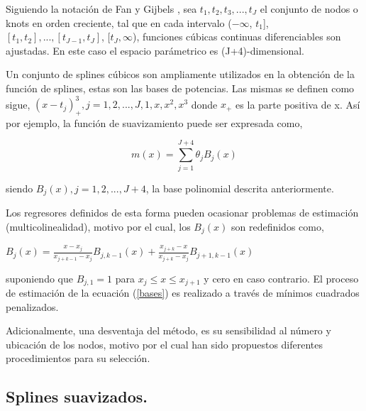 \hspace*{0.4 cm}Siguiendo la notaci\'on de Fan y Gijbels \cite{FG}, sea $t_{1}, t_{2}, t_{3},...,t_{J}$ el conjunto de nodos o knots en orden creciente, tal que en cada intervalo  ($-\infty$, $t_{1}$], $[t_{1}, t_{2}],..., [t_{J-1}, t_{J}]$, [$t_{J}, \infty$), funciones c\'ubicas continuas diferenciables son ajustadas. En este caso el espacio par\'ametrico es (J+4)-dimensional.

\hspace*{0.4 cm} Un conjunto de splines c\'ubicos son ampliamente utilizados en la obtenci\'on de la funci\'on de splines, estas son las bases de potencias. Las mismas se definen como sigue, $(x- t_{j})_{+}^{3}, j= 1,2,...,J,1,x,x^2,x^3$ donde $x_{+}$ es la parte positiva de x. As\'i por ejemplo, la funci\'on de suavizamiento puede ser expresada como,

\begin{equation}
m(x) = \sum_{j=1}^{J+4} \theta_{j}B_{j}(x) 
\label{bases}
\end{equation}

\noindent siendo $B_{j}(x), j = 1, 2,... , J+4$, la base polinomial descrita anteriormente.

\hspace*{0.4 cm} Los regresores definidos de esta forma pueden ocasionar problemas de estimaci\'on (multicolinealidad), motivo por el cual, los $B_{j}(x)$ son
redefinidos como,

\vspace*{0.2 cm}


\begin{center}
$\displaystyle{ B_{j}(x) = \frac{x-x_{j}}{x_{j+k-1}-x_{j}} B_{j,k-1}(x) + \frac{x_{j+k}-x}{x_{j+k}-x_{j}} B_{j+1,k-1}(x) }$
\end{center}

\vspace*{0.2 cm}


\noindent suponiendo que $B_{j,1}=1$ para $x_{j} \leq x \leq x_{j+1}$ y cero en caso contrario. El proceso de estimaci\'on de la ecuaci\'on (\ref{bases}) es realizado a trav\'es de m\'inimos cuadrados penalizados.

\hspace*{0.4 cm}Adicionalmente, una desventaja del m\'etodo, es su sensibilidad al n\'umero y ubicaci\'on de los nodos, motivo por el cual han sido propuestos diferentes procedimientos para su selecci\'on.

\subsection{Splines suavizados.\\}



